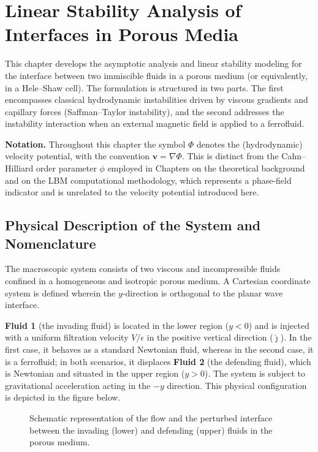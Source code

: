 \section{Linear Stability Analysis of Interfaces in Porous Media}
\label{sec:lsa}

This chapter develops the asymptotic analysis and linear stability modeling for the interface between two immiscible fluids in a porous medium (or equivalently, in a Hele--Shaw cell). The formulation is structured in two parts. The first encompasses classical hydrodynamic instabilities driven by viscous gradients and capillary forces (Saffman--Taylor instability), and the second addresses the instability interaction when an external magnetic field is applied to a ferrofluid.

\medskip
\noindent\textbf{Notation.} Throughout this chapter the symbol $\Phi$ denotes the (hydrodynamic) velocity potential, with the convention $\mathbf{v} = \nabla\Phi$. This is distinct from the Cahn--Hilliard order parameter $\phi$ employed in Chapters on the theoretical background and on the LBM computational methodology, which represents a phase-field indicator and is unrelated to the velocity potential introduced here.

\subsection{Physical Description of the System and Nomenclature}

The macroscopic system consists of two viscous and incompressible fluids confined in a homogeneous and isotropic porous medium. A Cartesian coordinate system is defined wherein the $y$-direction is orthogonal to the planar wave interface.

\textbf{Fluid 1} (the invading fluid) is located in the lower region ($y < 0$) and is injected with a uniform filtration velocity $V/\epsilon$ in the positive vertical direction ($\hat{\jmath}$). In the first case, it behaves as a standard Newtonian fluid, whereas in the second case, it is a ferrofluid; in both scenarios, it displaces \textbf{Fluid 2} (the defending fluid), which is Newtonian and situated in the upper region ($y > 0$). The system is subject to gravitational acceleration acting in the $-y$ direction. This physical configuration is depicted in the figure below.

\begin{figure}[htbp]
  \centering
  \caption{Schematic representation of the flow and the perturbed interface between the invading (lower) and defending (upper) fluids in the porous medium.}
  \label{fig:physical_scheme}
\end{figure}

